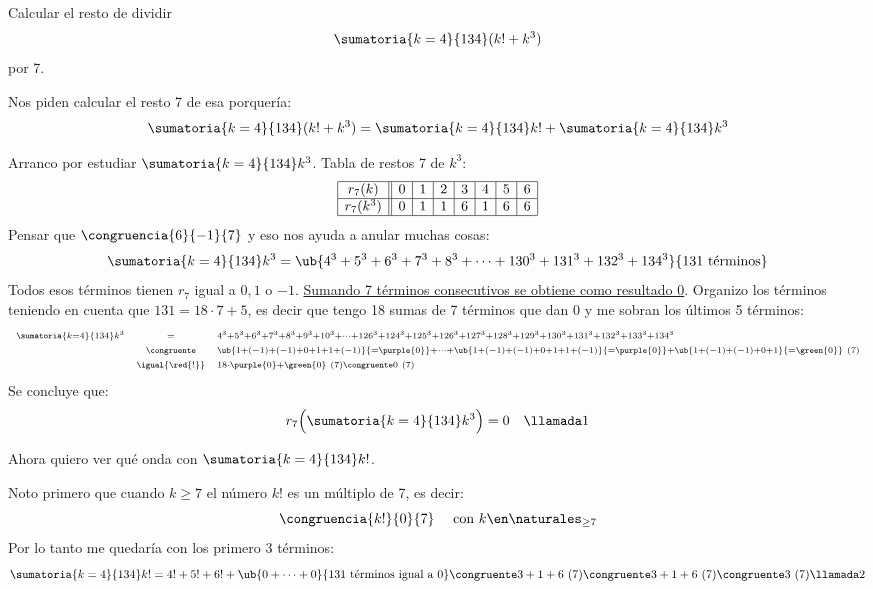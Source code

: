 \begin{enunciado}{\ejExtra}
  Calcular el resto de dividir
  $$
    \sumatoria{k = 4}{134} (k! + k^3)
  $$
  por 7.
\end{enunciado}

Nos piden calcular el resto 7 de esa porquería:
$$
  \sumatoria{k = 4}{134} (k! + k^3)
  =
  \sumatoria{k = 4}{134} k! + \sumatoria{k = 4}{134} k^3
$$

Arranco por estudiar $\sumatoria{k = 4}{134} k^3$. Tabla de restos 7 de $k^3$:
$$
  \begin{array}{|c||c|c|c|c|c|c|c|}
    \hline
    r_7(k)   & 0 & 1 & 2 & 3 & 4 & 5 & 6 \\ \hline
    r_7(k^3) & 0 & 1 & 1 & 6 & 1 & 6 & 6 \\ \hline
  \end{array}
$$
Pensar que $\congruencia{6}{-1}{7}$ y eso nos ayuda a anular muchas cosas:
$$
  \sumatoria{k = 4}{134} k^3 = \ub{4^3 + 5^3 + 6^3 + 7^3 + 8^3 + \cdots + 130^3 + 131^3 + 132^3 + 134^3}{131 \text{ términos}}
$$
Todos esos términos tienen $r_7$ igual a $0, 1$ o $-1$. \underline{Sumando 7 términos consecutivos se obtiene como resultado 0}. Organizo los términos teniendo en cuenta que
$131 = 18 \cdot 7 + 5 $, es decir que tengo 18 sumas de 7 términos que dan 0 y me sobran los últimos 5 términos:
$$
  \scriptstyle
  \begin{array}{rcl}
    \scriptstyle
    \sumatoria{k = 4}{134} k^3 & \scriptstyle=                & \scriptstyle4^3 + 5^3 + 6^3 + 7^3 + 8^3 + 9^3 + 10^3 + \cdots + 126^3 + 124^3+125^3+126^3+ 127^3 + 128^3 + 129^3 + 130^3 + 131^3 + 132^3 + 133^3 + 134^3                                                                    \\
                               & \scriptstyle \congruente     & \scriptstyle \ub{\scriptstyle1 + (-1) + (-1) + 0 + 1 + 1 + (-1)}{= \purple{0}} + \cdots +  \ub{\scriptstyle1 + (-1) + (-1) + 0 + 1 + 1 + (-1)}{= \purple{0}} + \ub{ \scriptstyle1 + (-1) + (-1) + 0 + 1}{= \green{0}} \ (7) \\
                               & \scriptstyle \igual{\red{!}} & \scriptstyle 18 \cdot \purple{0} + \green{0}\ (7) \congruente 0\ (7)
  \end{array}
$$
Se concluye que:
$$
  r_7\Big( \sumatoria{k = 4}{134} k^3\Big) = 0 \quad\llamada1
$$
\bigskip

Ahora quiero ver qué onda con $\sumatoria{k = 4}{134}k!$.\par
Noto primero que cuando $k \geq 7$ el número $k!$ es un múltiplo de 7, es decir:
$$
  \congruencia{k!}{0}{7} \quad \text{ con } k \en \naturales_{\geq 7}
$$
Por lo tanto me quedaría con los primero 3 términos:
$$
  \sumatoria{k = 4}{134} k! = 4! + 5! + 6! + \ub{ 0 + \cdots + 0}{131 \text{ términos igual a 0}}
  \congruente
  3 + 1 + 6 \ (7)
  \congruente
  3 + 1 + 6 \ (7)
  \congruente
  3 \ (7) \llamada2
$$

